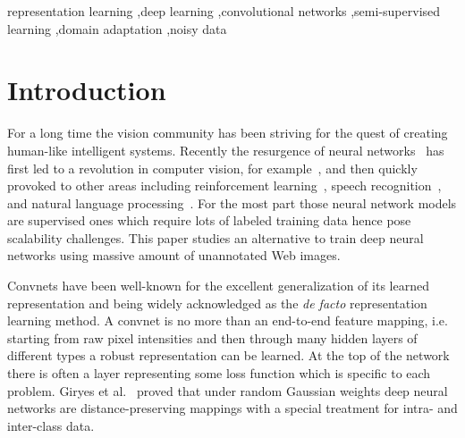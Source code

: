 \documentclass[preprint,12pt]{elsarticle}
\begin{document}
\begin{frontmatter}
\begin{keyword}
representation learning \sep deep learning \sep convolutional networks \sep semi-supervised learning \sep domain adaptation \sep noisy data



\end{keyword}

\end{frontmatter}


\section{Introduction}\label{sec:intro} %
\noindent For a long time the vision community has been striving for the quest of creating human-like intelligent systems. Recently the resurgence of neural networks~\cite{DBLP:conf/ijcai/Hinton05,DBLP:journals/neco/HintonOT06,bengio2007greedy} has first led to a revolution in computer vision, for example~\cite{DBLP:journals/nn/CiresanMMS12,DBLP:conf/nips/KrizhevskySH12,DBLP:journals/corr/SimonyanZ14a,DBLP:journals/corr/SzegedyLJSRAEVR14,razavian2014cnn}, and then quickly provoked to other areas including reinforcement learning~\cite{DBLP:journals/corr/MnihKSGAWR13}, speech recognition~\cite{DBLP:conf/icassp/GravesMH13}, and natural language processing~\cite{DBLP:conf/nips/MikolovSCCD13}. For the most part those neural network models are supervised ones which require lots of labeled training data hence pose scalability challenges. This paper studies an alternative to train deep neural networks using massive amount of unannotated Web images.

Convnets have been well-known for the excellent generalization of its learned representation and being widely acknowledged as the \emph{de facto} representation learning method. A convnet is no more than an end-to-end feature mapping, i.e. starting from raw pixel intensities and then through many hidden layers of different types a robust representation can be learned. At the top of the network there is often a layer representing some loss function which is specific to each problem.  Giryes et al.~\cite{DBLP:journals/corr/GiryesSB15} proved that under random Gaussian weights deep neural networks are distance-preserving mappings with a special treatment for intra- and inter-class data.  
\end{document}
